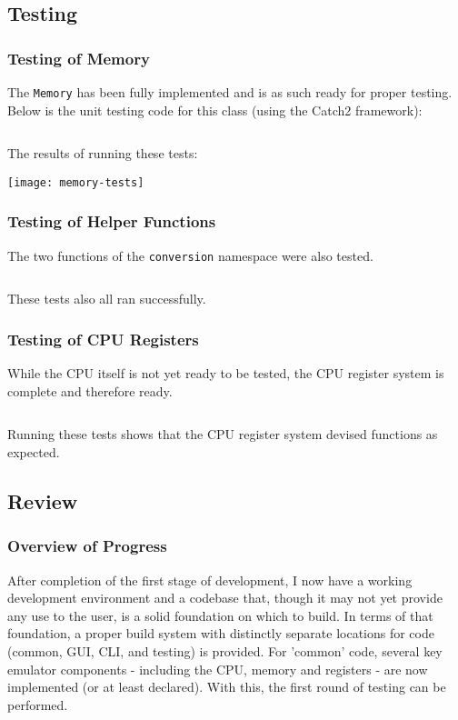         \inputminted{c++}{code/initial/conversion.cpp}


\subsection{Testing}
    \subsubsection{Testing of Memory} \label{initial-testing-memory}
        The \texttt{Memory} has been fully implemented and is as such ready for proper testing. Below is the unit testing code for this class (using the Catch2 framework):

        \inputminted{c++}{code/initial/testmemory.cpp}

        The results of running these tests:

        \texttt{[image: memory-tests]}

    \subsubsection{Testing of Helper Functions}
        The two functions of the \texttt{conversion} namespace were also tested.

        \inputminted{c++}{code/initial/testconversions.cpp}

        These tests also all ran successfully.

    \subsubsection{Testing of CPU Registers}
        While the CPU itself is not yet ready to be tested, the CPU register system is complete and therefore ready.

        \inputminted{c++}{code/initial/testregisters.cpp}

        Running these tests shows that the CPU register system devised functions as expected.

\subsection{Review}
    \subsubsection{Overview of Progress}
        After completion of the first stage of development, I now have a working development environment and a codebase that, though it may not yet provide any use to the user, is a solid foundation on which to build. In terms of that foundation, a proper build system with distinctly separate locations for code (common, GUI, CLI, and testing) is provided. For 'common' code, several key emulator components - including the CPU, memory and registers - are now implemented (or at least declared). With this, the first round of testing can be performed.

